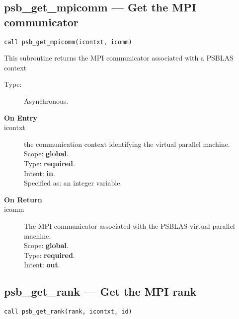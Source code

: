 \clearpage\subsection*{psb\_get\_mpicomm --- Get the MPI communicator}

\begin{verbatim}
call psb_get_mpicomm(icontxt, icomm)
\end{verbatim}

This subroutine returns the MPI communicator associated with a PSBLAS context
\begin{description}
\item[Type:] Asynchronous.
\item[\bf  On Entry ]
\item[icontxt] the communication context identifying the virtual
  parallel machine.\\
Scope: {\bf global}.\\
Type: {\bf required}.\\
Intent: {\bf in}.\\
Specified as: an integer variable.
\end{description}

\begin{description}
\item[\bf On Return]
\item[icomm] The MPI communicator associated with the  PSBLAS virtual parallel machine.\\
Scope: {\bf global}.\\
Type: {\bf required}.\\
Intent: {\bf out}.\\
\end{description}


\clearpage\subsection*{psb\_get\_rank --- Get the MPI rank}

\begin{verbatim}
call psb_get_rank(rank, icontxt, id)
\end{verbatim}

